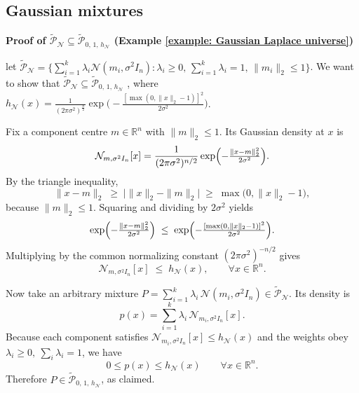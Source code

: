 \documentclass[accepted]{article}
\theoremstyle{plain} %
\theoremstyle{definition}
\theoremstyle{remark}
\newcommand{\HG}[1]{\textcolor{cyan}{[#1]}}
\begin{document}

\subsection{Gaussian mixtures}\label{appendix: gaussian ring}

\textbf{Proof of $\tilde{\mathcal{P}}_{\mathcal{N}} \subseteq \tilde{\mathcal{P}}_{0,\, 1,\, h_{\mathcal{N}}}$ (Example \ref{example: Gaussian Laplace universe})} 

let $\tilde{\mathcal{P}}_{\mathcal{N}}  = \Big\{ \sum_{i=1}^k \lambda_i \mathcal{N}(m_i, \sigma^2 I_n)  :  \lambda_i \geq 0, \, \sum_{i=1}^k \lambda_i = 1, \, \|m_i\|_2 \leq 1 \Big\}$. We want to show that  $\tilde{\mathcal{P}}_{\mathcal{N}} \subseteq \tilde{\mathcal{P}}_{0,\, 1,\, h_{\mathcal{N}}}$ , where $h_{\mathcal{N}}(x) = \frac{1}{(2\pi \sigma^2)^\frac{n}{2}} \exp\big(-\frac{[\max(0, \|x\|_2 - 1)]^2}{2\sigma^2} \big)$.

Fix a component centre \(m\in\mathbb{R}^{n}\) with \(\|m\|_{2}\le1\).
Its Gaussian density at \(x\) is
\[
\mathcal{N}_{m,\sigma^{2}I_{n}}[x]
=\frac{1}{(2\pi\sigma^{2})^{n/2}}
  \exp\Bigl(
     -\tfrac{\|x-m\|_{2}^{2}}{2\sigma^{2}}
  \Bigr).
\]
By the triangle inequality,
\[
\|x-m\|_{2}
\;\ge\;
\bigl|\|x\|_{2}-\|m\|_{2}\bigr|
\;\ge\;
\max\bigl(0,\|x\|_{2}-1\bigr),
\]
because \(\|m\|_{2}\le1\).
Squaring and dividing by \(2\sigma^{2}\) yields
\[
\exp\Bigl(
  -\tfrac{\|x-m\|_{2}^{2}}{2\sigma^{2}}
\Bigr)
\;\le\;
\exp\Bigl(
  -\tfrac{[\max(0,\|x\|_{2}-1)]^{2}}{2\sigma^{2}}
\Bigr).
\]
Multiplying by the common normalizing constant
\((2\pi\sigma^{2})^{-n/2}\) gives
\[
\mathcal{N}_{m,\sigma^{2}I_{n}}[x]
\;\le\;
h_{\mathcal{N}}(x),\qquad\forall x\in\mathbb{R}^{n}.
\]

Now take an arbitrary mixture
\(P=\sum_{i=1}^{k}\lambda_{i}\,\mathcal{N}(m_{i},\sigma^{2}I_{n})
\in\tilde{\mathcal{P}}_{\mathcal{N}}\).
Its density is
\[
p(x)=\sum_{i=1}^{k}\lambda_{i}\,
      \mathcal{N}_{m_{i},\sigma^{2}I_{n}}[x].
\]
Because each component satisfies
\(\mathcal{N}_{m_{i},\sigma^{2}I_{n}}[x]\le h_{\mathcal{N}}(x)\) and the
weights obey \(\lambda_{i}\ge0,\ \sum_{i}\lambda_{i}=1\), we have
\[
0\le p(x)\le h_{\mathcal{N}}(x)\qquad\forall x\in\mathbb{R}^{n}.
\]
Therefore \(P\in\tilde{\mathcal{P}}_{0,\,1,\,h_{\mathcal{N}}}\), as
claimed.
\end{document}
